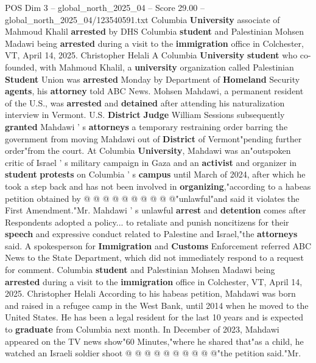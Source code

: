 \begin{textsample}{POS Dim 3 – global\_north\_2025\_04 – Score 29.00 – global\_north\_2025\_04/123540591.txt}  \label{ex:f3_pos_047}
Columbia \textbf{University} associate of Mahmoud Khalil \textbf{arrested} by DHS Columbia \textbf{student} and Palestinian Mohsen Madawi being \textbf{arrested} during a visit to the \textbf{immigration} office in Colchester, VT, April 14, 2025.
Christopher Helali A Columbia \textbf{University} \textbf{student} who co-founded, with Mahmoud Khalil, a \textbf{university} organization called Palestinian \textbf{Student} Union was \textbf{arrested} Monday by Department of \textbf{Homeland} Security \textbf{agents}, his \textbf{attorney} told ABC News.
Mohsen Mahdawi, a permanent resident of the U.S., was \textbf{arrested} and \textbf{detained} after attending his naturalization interview in Vermont.
U.S. \textbf{District} \textbf{Judge} William Sessions subsequently \textbf{granted} Mahdawi ' s \textbf{attorneys} a temporary restraining order barring the government from moving Mahdawi out of \textbf{District} of Vermont"pending further order"from the court.
At Columbia \textbf{University}, Mahdawi was an"outspoken critic of Israel ' s military campaign in Gaza and an \textbf{activist} and organizer in \textbf{student} \textbf{protests} on Columbia ' s \textbf{campus} until March of 2024, after which he took a step back and has not been involved in \textbf{organizing},"according to a habeas petition obtained by @ @ @ @ @ @ @ @ @ @"unlawful"and said it violates the First Amendment."Mr.
Mahdawi ' s unlawful \textbf{arrest} and \textbf{detention} comes after Respondents adopted a policy... to retaliate and punish noncitizens for their \textbf{speech} and expressive conduct related to Palestine and Israel,"the \textbf{attorneys} said.
A spokesperson for \textbf{Immigration} and \textbf{Customs} Enforcement referred ABC News to the State Department, which did not immediately respond to a request for comment.
Columbia \textbf{student} and Palestinian Mohsen Madawi being \textbf{arrested} during a visit to the \textbf{immigration} office in Colchester, VT, April 14, 2025.
Christopher Helali According to his habeas petition, Mahdawi was born and raised in a refugee camp in the West Bank, until 2014 when he moved to the United States.
He has been a legal resident for the last 10 years and is expected to \textbf{graduate} from Columbia next month.
In December of 2023, Mahdawi appeared on the TV news show"60 Minutes,"where he shared that"as a child, he watched an Israeli soldier shoot @ @ @ @ @ @ @ @ @ @"the petition said."Mr.

\end{textsample}
